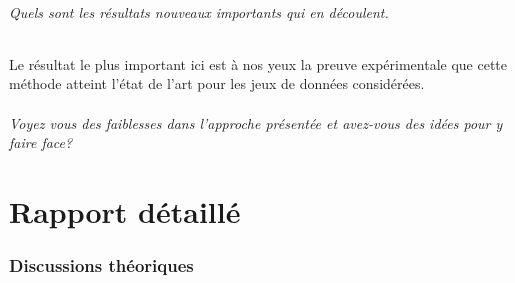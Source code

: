 \documentclass{article}
\begin{document}
\paragraph{Quels sont les résultats nouveaux importants qui en découlent.}
Le résultat le plus important ici est à nos yeux la preuve expérimentale que cette
méthode atteint l'état de l'art pour les jeux de données considérées.
\paragraph{Voyez vous des faiblesses dans l'approche présentée et avez-vous des idées
pour y faire face?}

\part{Rapport détaillé}
\section{Discussions théoriques}
\end{document}
